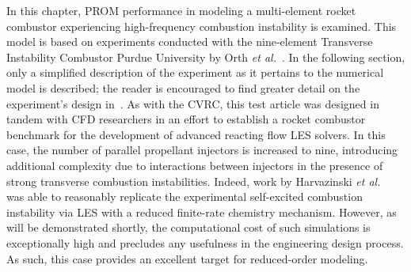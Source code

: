 

In this chapter, PROM performance in modeling a multi-element rocket combustor experiencing high-frequency combustion instability is examined. This model is based on experiments conducted with the nine-element Transverse Instability Combustor Purdue University by Orth \textit{et al.}~\cite{Orth2018}. In the following section, only a simplified description of the experiment as it pertains to the numerical model is described; the reader is encouraged to find greater detail on the experiment's design in~\cite{Orth2018}. As with the CVRC, this test article was designed in tandem with CFD researchers in an effort to establish a rocket combustor benchmark for the development of advanced reacting flow LES solvers. In this case, the number of parallel propellant injectors is increased to nine, introducing additional complexity due to interactions between injectors in the presence of strong transverse combustion instabilities. Indeed, work by Harvazinski \textit{et al.}~\cite{Harvazinski2019} was able to reasonably replicate the experimental self-excited combustion instability via LES with a reduced finite-rate chemistry mechanism. However, as will be demonstrated shortly, the computational cost of such simulations is exceptionally high and precludes any usefulness in the engineering design process. As such, this case provides an excellent target for reduced-order modeling.

